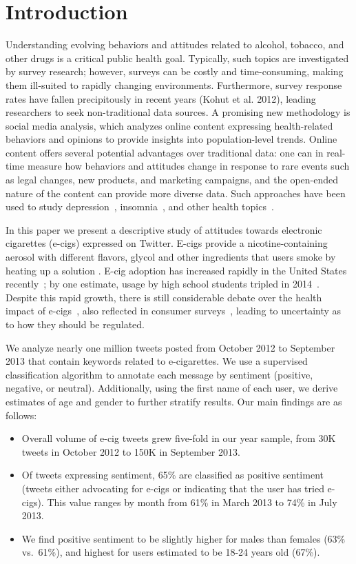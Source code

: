 \documentclass{sig-alternate}
\begin{document}
\section{Introduction}
Understanding evolving behaviors and attitudes related to alcohol, tobacco,
and other drugs is a critical public health goal. Typically, such topics are
investigated by survey research; however, surveys can be costly and
time-consuming, making them ill-suited to rapidly changing
environments. Furthermore, survey response rates have fallen precipitously in
recent years (Kohut et al. 2012), leading researchers to seek non-traditional
data sources. A promising new methodology is social media analysis, which
analyzes online content expressing health-related behaviors and opinions to
provide insights into population-level trends. Online content offers several
potential advantages over traditional data: one can in real-time measure how
behaviors and attitudes change in response to rare events such as legal
changes, new products, and marketing campaigns, and the open-ended nature of
the content can provide more diverse data. Such approaches have been used to
study depression~\cite{choudhury2013predicting}, insomnia~\cite{powell2012i},
and other health topics~\cite{dredze2012how}.

In this paper we present a descriptive study of attitudes towards electronic
cigarettes (e-cigs) expressed on Twitter. E-cigs provide a
nicotine-containing aerosol with different flavors, glycol and other
ingredients that users smoke by heating up a solution
\cite{grana2014cigarettes}. E-cig adoption has increased rapidly in the United
States recently~\cite{king2013awareness,centers2013notes}; by one estimate,
usage by high school students tripled in 2014~\cite{ecig2015triples}. Despite
this rapid growth, there is still considerable debate over the health impact
of e-cigs~\cite{sussan2015exposure,pauly2007tobacco,bhatnagar2014electronic},
also reflected in consumer surveys~\cite{pepper2015risky}, leading to
uncertainty as to how they should be regulated.

We analyze nearly one million tweets posted from October 2012 to September
2013 that contain keywords related to e-cigarettes. We use a supervised
classification algorithm to annotate each message by sentiment (positive,
negative, or neutral). Additionally, using the first name of each user, we
derive estimates of age and gender to further stratify results. Our main
findings are as follows:
\begin{itemize}
\item Overall volume of e-cig tweets grew five-fold in our year sample, from
  30K tweets in October 2012 to 150K in September 2013.
\item Of tweets expressing sentiment, 65\% are classified as positive
  sentiment (tweets either advocating for e-cigs or indicating that the user
  has tried e-cigs). This value ranges by month from 61\% in March 2013 to
  74\% in July 2013. 
\item We find positive sentiment to be slightly higher for males than females
  (63\% vs.~61\%), and highest for users estimated to be 18-24 years old (67\%).
\end{itemize}
\end{document}
